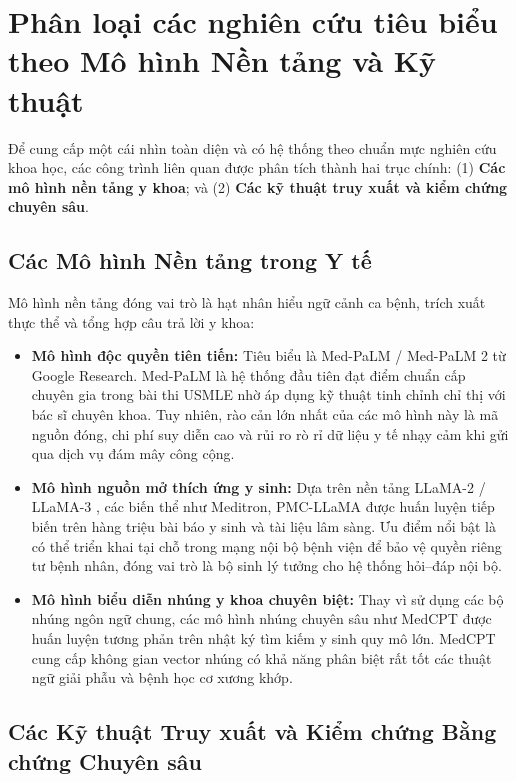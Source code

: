 \section{Phân loại các nghiên cứu tiêu biểu theo Mô hình Nền tảng và Kỹ thuật}

Để cung cấp một cái nhìn toàn diện và có hệ thống theo chuẩn mực nghiên cứu khoa học, các công trình liên quan được phân tích thành hai trục chính: (1) \textbf{Các mô hình nền tảng y khoa}; và (2) \textbf{Các kỹ thuật truy xuất và kiểm chứng chuyên sâu}.

\subsection{Các Mô hình Nền tảng trong Y tế}
Mô hình nền tảng đóng vai trò là hạt nhân hiểu ngữ cảnh ca bệnh, trích xuất thực thể và tổng hợp câu trả lời y khoa:
\begin{itemize}
    \item \textbf{Mô hình độc quyền tiên tiến:} Tiêu biểu là Med-PaLM / Med-PaLM 2 \cite{singhal2023medpalm} từ Google Research. Med-PaLM là hệ thống đầu tiên đạt điểm chuẩn cấp chuyên gia trong bài thi USMLE nhờ áp dụng kỹ thuật tinh chỉnh chỉ thị với bác sĩ chuyên khoa. Tuy nhiên, rào cản lớn nhất của các mô hình này là mã nguồn đóng, chi phí suy diễn cao và rủi ro rò rỉ dữ liệu y tế nhạy cảm khi gửi qua dịch vụ đám mây công cộng.
    \item \textbf{Mô hình nguồn mở thích ứng y sinh:} Dựa trên nền tảng LLaMA-2 / LLaMA-3 \cite{touvron2023llama}, các biến thể như Meditron, PMC-LLaMA được huấn luyện tiếp biến trên hàng triệu bài báo y sinh và tài liệu lâm sàng. Ưu điểm nổi bật là có thể triển khai tại chỗ trong mạng nội bộ bệnh viện để bảo vệ quyền riêng tư bệnh nhân, đóng vai trò là bộ sinh lý tưởng cho hệ thống hỏi--đáp nội bộ.
    \item \textbf{Mô hình biểu diễn nhúng y khoa chuyên biệt:} Thay vì sử dụng các bộ nhúng ngôn ngữ chung, các mô hình nhúng chuyên sâu như MedCPT \cite{jin2023medcpt} được huấn luyện tương phản trên nhật ký tìm kiếm y sinh quy mô lớn. MedCPT cung cấp không gian vector nhúng có khả năng phân biệt rất tốt các thuật ngữ giải phẫu và bệnh học cơ xương khớp.
\end{itemize}

\subsection{Các Kỹ thuật Truy xuất và Kiểm chứng Bằng chứng Chuyên sâu}

